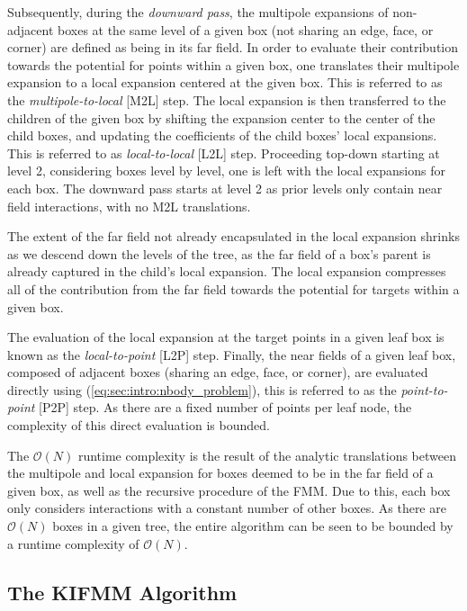 \documentclass{IEEEcsmag}
\begin{document}
Subsequently, during the \textit{downward pass}, the multipole expansions of non-adjacent boxes at the same level of a given box (not sharing an edge, face, or corner) are defined as being in its far field. In order to evaluate their contribution towards the potential for points within a given box, one translates their multipole expansion to a local expansion centered at the given box. This is referred to as the \textit{multipole-to-local} [M2L] step. The local expansion is then transferred to the children of the given box by shifting the expansion center to the center of the child boxes, and updating the coefficients of the child boxes' local expansions. This is referred to as \textit{local-to-local} [L2L] step. Proceeding top-down starting at level 2, considering boxes level by level, one is left with the local expansions for each box. The downward pass starts at level 2 as prior levels only contain near field interactions, with no M2L translations.

The extent of the far field not already encapsulated in the local expansion shrinks as we descend down the levels of the tree, as the far field of a box's parent is already captured in the child's local expansion. The local expansion compresses all of the contribution from the far field towards the potential for targets within a given box.

The evaluation of the local expansion at the target points in a given leaf box is known as the \textit{local-to-point} [L2P] step. Finally, the near fields of a given leaf box, composed of adjacent boxes (sharing an edge, face, or corner), are evaluated directly using (\ref{eq:sec:intro:nbody_problem}), this is referred to as the \textit{point-to-point} [P2P] step. As there are a fixed number of points per leaf node, the complexity of this direct evaluation is bounded.

The $\mathcal{O}(N)$ runtime complexity is the result of the analytic translations between the multipole and local expansion for boxes deemed to be in the far field of a given box, as well as the recursive procedure of the FMM. Due to this, each box only considers interactions with a constant number of other boxes. As there are $\mathcal{O}(N)$ boxes in a given tree, the entire algorithm can be seen to be bounded by a runtime complexity of $\mathcal{O}(N)$.

\subsection{The KIFMM Algorithm}
\end{document}
